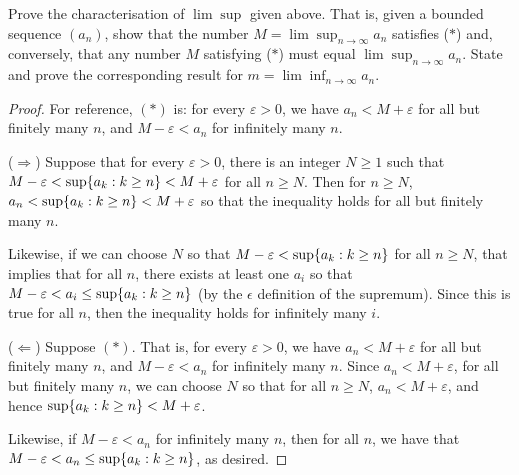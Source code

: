 \begin{exercise}{26}
Prove the characterisation of $\lim\sup$ given above. That is, given a bounded sequence $(a_n)$, show that the number $M=\lim\sup_{n\to\infty}a_n$ satisfies ($\ast$) and, conversely, that any number $M$ satisfying ($\ast$) must equal $\lim\sup_{n\to\infty}a_n$. State and prove the corresponding result for $m=\lim\inf_{n\to\infty}a_n$.
\end{exercise}
\begin{proof}
For reference, $(\ast)$ is: for every $\varepsilon>0$, we have $a_n<M+\varepsilon$ for all but finitely many $n$, and $M-\varepsilon<a_n$ for infinitely many $n$.

($\Rightarrow$) Suppose that for every $\varepsilon>0$, there is an integer $N\geq 1$ such that $M-\varepsilon<\sup\{a_k:k\geq n\}<M+\varepsilon$ for all $n\geq N$. Then for $n\geq N$, $a_n<\sup\{a_k:k\geq n\}<M+\varepsilon$ so that the inequality holds for all but finitely many $n$. 

Likewise, if we can choose $N$ so that $M-\varepsilon<\sup\{a_k:k\geq n\}$ for all $n\geq N$, that implies that for all $n$, there exists at least one $a_i$ so that $M-\varepsilon<a_i\leq\sup\{a_k:k\geq n\}$ (by the $\epsilon$ definition of the supremum). Since this is true for all $n$, then the inequality holds for infinitely many $i$.

($\Leftarrow$) Suppose $(\ast)$. That is, for every $\varepsilon>0$, we have $a_n<M+\varepsilon$ for all but finitely many $n$, and $M-\varepsilon<a_n$ for infinitely many $n$. Since $a_n<M+\varepsilon$, for all but finitely many $n$, we can choose $N$ so that for all $n\geq N$, $a_n<M+\varepsilon$, and hence $\sup\{a_k:k\geq n\}<M+\varepsilon$. 

Likewise, if $M-\varepsilon<a_n$ for infinitely many $n$, then for all $n$, we have that $M-\varepsilon<a_n\leq\sup\{a_k:k\geq n\}$, as desired.
\end{proof}

